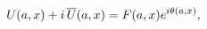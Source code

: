 \[\mathop{U\/}\nolimits\!\left(a,x\right)+i\mathop{\overline{U}\/}\nolimits\!%
\left(a,x\right)=F(a,x)e^{i\theta(a,x)},\]